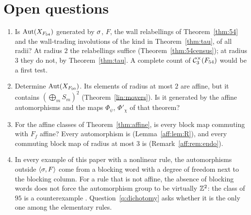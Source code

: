 \section{Open questions}\label{sec:questions}

\begin{enumerate}
\item Is $\operatorname{Aut}(X_{F_{54}})$ generated by $\sigma$, $F$, the wall relabellings of Theorem~\ref{thm:54} and the wall-trading involutions of the kind in Theorem~\ref{thm:tau}, of all radii? At radius $2$ the relabellings suffice (Theorem~\ref{thm:54census}); at radius $3$ they do not, by Theorem~\ref{thm:tau}. A complete count of $\mathcal{C}^{\times}_3(F_{54})$ would be a first test.
\item Determine $\operatorname{Aut}(X_{F_{90}})$. Its elements of radius at most $2$ are affine, but it contains $(\bigoplus_mS_m)^2$ (Theorem~\ref{lin:movers}). Is it generated by the affine automorphisms and the maps $\Phi_\psi$, $\Phi'_\chi$ of that theorem?
\item For the affine classes of Theorem~\ref{thm:affine}, is every block map commuting with $F_f$ affine? Every automorphism is (Lemma~\ref{aff:lem:R}), and every commuting block map of radius at most $3$ is (Remark~\ref{aff:rem:endo}).
\item In every example of this paper with a nonlinear rule, the automorphisms outside $\langle\sigma,F\rangle$ come from a blocking word with a degree of freedom next to the blocking column. For a rule that is not affine, the absence of blocking words does not force the automorphism group to be virtually $\mathbb{Z}^2$: the class of $95$ is a counterexample \cite{PaperE}. Question~\ref{q:dichotomy} asks whether it is the only one among the elementary rules.
\end{enumerate}
